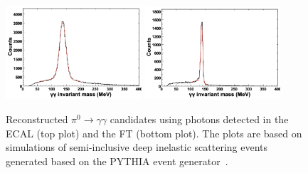 \begin{figure}[t]
\centering
\includegraphics[width=0.45\textwidth]{pics/ecal_pi0.png}
\includegraphics[width=0.45\textwidth]{pics/ft_pi0.png}
\caption{Reconstructed $\pi^0 \to \gamma \gamma$ candidates using photons detected in the ECAL (top plot) and
  the FT (bottom plot). The plots are based on simulations of semi-inclusive deep inelastic scattering events
  generated based on the PYTHIA event generator~\cite{clasdis}.}
\label{fig:pi0mass}
\end{figure}

